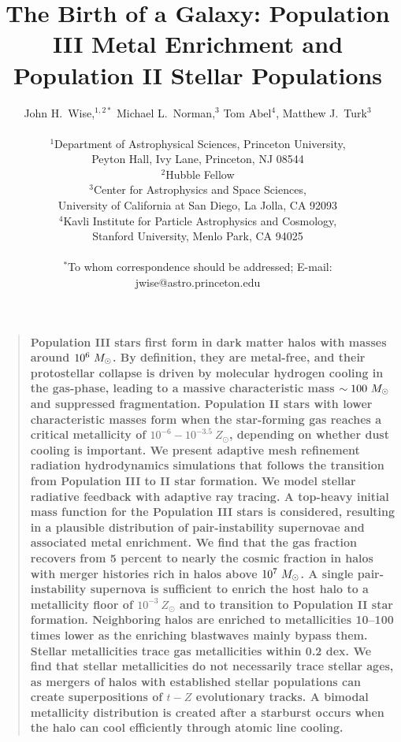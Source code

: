 \documentclass[12pt]{article}
\title{The Birth of a Galaxy: Population III Metal Enrichment and
  Population II Stellar Populations}
\author
{John H.~Wise,$^{1,2\ast}$ Michael L.~Norman,$^{3}$ Tom Abel$^{4}$,
Matthew J.~Turk$^{3}$\\
\\
\normalsize{$^{1}$Department of Astrophysical Sciences, Princeton
University,}\\
\normalsize{Peyton Hall, Ivy Lane, Princeton, NJ 08544}\\
\normalsize{$^{2}$Hubble Fellow}\\
\normalsize{$^{3}$Center for Astrophysics and Space Sciences,}\\
\normalsize{University of California at San Diego, La Jolla, CA 92093}\\
\normalsize{$^{4}$Kavli Institute for Particle Astrophysics and
  Cosmology, }\\
\normalsize{Stanford University, Menlo Park, CA 94025}\\
\\
\normalsize{$^\ast$To whom correspondence should be addressed; E-mail:
jwise@astro.princeton.edu}
}
\date{}
\newcommand{\Ms}{\ifmmode{M_\odot}\else{$M_\odot$}\fi}
\newenvironment{sciabstract}{%
\begin{quote} \bf}
{\end{quote}}
\begin{document}
 


\baselineskip24pt


\maketitle 


\begin{sciabstract}
  Population III stars first form in dark matter halos with masses
  around $10^6~\Ms$.  By definition, they are metal-free, and their
  protostellar collapse is driven by molecular hydrogen cooling in the
  gas-phase, leading to a massive characteristic mass $\sim 100~\Ms$
  and suppressed fragmentation.  Population II stars with lower
  characteristic masses form when the star-forming gas reaches a
  critical metallicity of $10^{-6} - 10^{-3.5}~Z_\odot$, depending on
  whether dust cooling is important.  We present adaptive mesh
  refinement radiation hydrodynamics simulations that follows the
  transition from Population III to II star formation.  We model
  stellar radiative feedback with adaptive ray tracing.  A top-heavy
  initial mass function for the Population III stars is considered,
  resulting in a plausible distribution of pair-instability supernovae
  and associated metal enrichment.  We find that the gas fraction
  recovers from 5 percent to nearly the cosmic fraction in halos with
  merger histories rich in halos above $10^7~\Ms$.  A single
  pair-instability supernova is sufficient to enrich the host halo to
  a metallicity floor of $10^{-3}~Z_\odot$ and to transition to
  Population II star formation.  Neighboring halos are enriched to
  metallicities 10--100 times lower as the enriching blastwaves mainly
  bypass them.  Stellar metallicities trace gas metallicities within
  0.2 dex.  We find that stellar metallicities do not necessarily
  trace stellar ages, as mergers of halos with established stellar
  populations can create superpositions of $t-Z$ evolutionary tracks.
  A bimodal metallicity distribution is created after a starburst
  occurs when the halo can cool efficiently through atomic line
  cooling.
\end{sciabstract}
\end{document}
